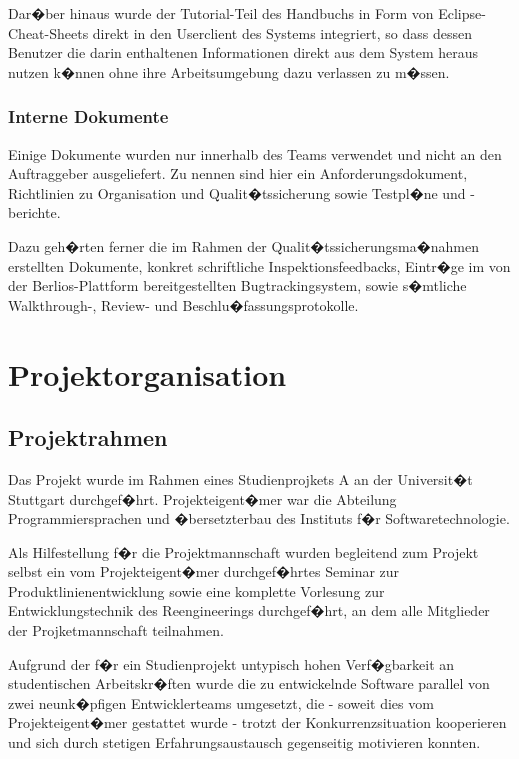 \documentclass[a4paper,titlepage,12pt,ngerman]{scrbook}
\begin{document}
Dar�ber hinaus wurde der Tutorial-Teil des Handbuchs in Form von Eclipse-Cheat-Sheets
direkt in den Userclient des Systems integriert, so dass dessen Benutzer die darin
enthaltenen Informationen direkt aus dem System heraus nutzen k�nnen ohne ihre
Arbeitsumgebung dazu verlassen zu m�ssen.

\subsection{Interne Dokumente}

Einige Dokumente wurden nur innerhalb des Teams verwendet und nicht an
den Auftraggeber ausgeliefert. Zu nennen sind hier ein Anforderungsdokument, 
Richtlinien zu Organisation und Qualit�tssicherung sowie Testpl�ne und 
-berichte.\par

Dazu geh�rten ferner die im Rahmen der Qualit�tssicherungsma�nahmen
erstellten Dokumente, konkret schriftliche Inspektionsfeedbacks, Eintr�ge
im von der Berlios-Plattform bereitgestellten Bugtrackingsystem, sowie s�mtliche
Walkthrough-, Review- und Beschlu�fassungsprotokolle.

\chapter{Projektorganisation}

\section{Projektrahmen}

Das Projekt wurde im Rahmen eines Studienprojkets A an der Universit�t Stuttgart
durchgef�hrt. Projekteigent�mer war die Abteilung Programmiersprachen und �bersetzterbau
des Instituts f�r Softwaretechnologie.\par

Als Hilfestellung f�r die Projektmannschaft wurden begleitend zum Projekt selbst ein 
vom Projekteigent�mer durchgef�hrtes Seminar zur Produktlinienentwicklung sowie eine
komplette Vorlesung zur Entwicklungstechnik des Reengineerings durchgef�hrt, an dem
alle Mitglieder der Projketmannschaft teilnahmen.\par

Aufgrund der f�r ein Studienprojekt untypisch hohen Verf�gbarkeit an studentischen
Arbeitskr�ften wurde die zu entwickelnde Software parallel von zwei neunk�pfigen
Entwicklerteams umgesetzt, die - soweit dies vom Projekteigent�mer gestattet wurde -
trotzt der Konkurrenzsituation kooperieren und sich durch stetigen Erfahrungsaustausch 
gegenseitig motivieren konnten.
\end{document}
